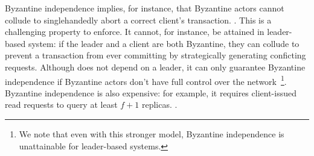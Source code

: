   
Byzantine independence implies, for instance, that Byzantine actors cannot collude to singlehandedly abort a correct client's transaction. .  This is a challenging property to enforce. It cannot, for instance, be attained in leader-based system: if the leader and a client are both Byzantine, they can collude to prevent a transaction from ever committing by strategically generating conficting requests. Although \sys{} does not depend on a leader, it can only guarantee Byzantine independence if Byzantine actors don't have full control over the network~\footnote{We note that even with this stronger model, Byzantine independence is unattainable for leader-based systems.}. Byzantine independence is also expensive: for example, it requires client-issued read requests to query at least $f+1$ replicas.  .

\iffalse
To achieve independent operability, \sys{} resorts to a leader only when a clients liveness is endagered, but side-steps byzantine-independence concerns by empowering said leader with a limited set of priviledges. At the same time, \sys{} can flexibly relax this requirement (for example, by allowing reads to query a client-specified set of replicas) if the deployment circumstances allow it. 
\fi

